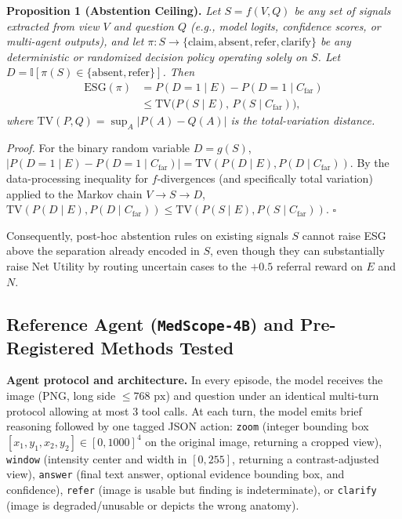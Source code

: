 \documentclass[5p,times,twocolumn,authoryear]{elsarticle}
\begin{document}
\textbf{Proposition 1 (Abstention Ceiling).} \emph{Let $S = f(V, Q)$ be any set of signals extracted from view $V$ and question $Q$ (e.g., model logits, confidence scores, or multi-agent outputs), and let $\pi: S \to \{\text{claim}, \text{absent}, \text{refer}, \text{clarify}\}$ be any deterministic or randomized decision policy operating solely on $S$. Let $D = \mathbb{I}[\pi(S) \in \{\text{absent}, \text{refer}\}]$. Then}
\begin{equation}
\label{eq:abstention_ceiling}
\begin{split}
\text{ESG}(\pi) &= P(D = 1 \mid E) - P(D = 1 \mid C_{\text{far}})\\
&\le \text{TV}\big(P(S \mid E),\, P(S \mid C_{\text{far}})\big),
\end{split}
\end{equation}
\emph{where $\text{TV}(P, Q) = \sup_{A} |P(A) - Q(A)|$ is the total-variation distance.}

\emph{Proof.} For the binary random variable $D = g(S)$, $|P(D=1 \mid E) - P(D=1 \mid C_{\text{far}})| = \text{TV}(P(D \mid E), P(D \mid C_{\text{far}}))$. By the data-processing inequality for $f$-divergences (and specifically total variation) applied to the Markov chain $V \to S \to D$, $\text{TV}(P(D \mid E), P(D \mid C_{\text{far}})) \le \text{TV}(P(S \mid E), P(S \mid C_{\text{far}}))$. $\square$

Consequently, post-hoc abstention rules on existing signals $S$ cannot raise ESG above the separation already encoded in $S$, even though they can substantially raise Net Utility by routing uncertain cases to the $+0.5$ referral reward on $E$ and $N$.

\subsection{Reference Agent (\texttt{MedScope-4B}) and Pre-Registered Methods Tested}
\label{subsec:method_agent}
\textbf{Agent protocol and architecture.} In every episode, the model receives the image (PNG, long side $\le 768\text{ px}$) and question under an identical multi-turn protocol allowing at most $3$ tool calls. At each turn, the model emits brief reasoning followed by one tagged JSON action: \texttt{zoom} (integer bounding box $[x_1, y_1, x_2, y_2] \in [0, 1000]^4$ on the original image, returning a cropped view), \texttt{window} (intensity center and width in $[0, 255]$, returning a contrast-adjusted view), \texttt{answer} (final text answer, optional evidence bounding box, and confidence), \texttt{refer} (image is usable but finding is indeterminate), or \texttt{clarify} (image is degraded/unusable or depicts the wrong anatomy).
\end{document}
